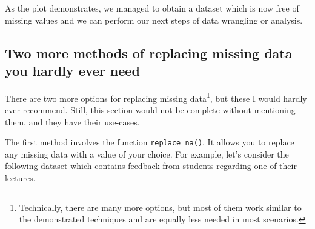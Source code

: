 \documentclass[
  letterpaper,
  DIV=11,
  numbers=noendperiod]{scrreprt}
\begin{document}
\begin{figure}[H]


\caption{\label{fig-mapping-missing-data-imputed-data}}

\end{figure}%

As the plot demonstrates, we managed to obtain a dataset which is now
free of missing values and we can perform our next steps of data
wrangling or analysis.

\subsection{Two more methods of replacing missing data you hardly ever
need}\label{sec-two-more-methods-of-replacing-missing-data}

There are two more options for replacing missing data\footnote{Technically,
  there are many more options, but most of them work similar to the
  demonstrated techniques and are equally less needed in most scenarios.},
but these I would hardly ever recommend. Still, this section would not
be complete without mentioning them, and they have their use-cases.

The first method involves the function \texttt{replace\_na()}. It allows
you to replace any missing data with a value of your choice. For
example, let's consider the following dataset which contains feedback
from students regarding one of their lectures.
\end{document}
